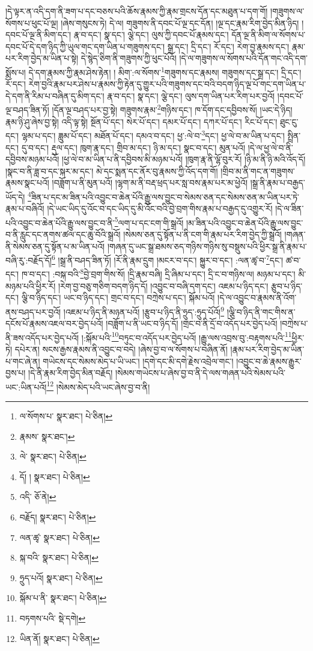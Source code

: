 །དེ་ལྟར་ན་འདི་དག་ནི་ཟག་པ་དང་བཅས་པའི་ཆོས་རྣམས་ཀྱི་རྣམ་གྲངས་དོན་དང་མཐུན་པ་དག་གོ། །གཟུགས་ལ་སོགས་པ་ཕུང་པོ་ལྔ། །ཞེས་གསུངས་ཏེ། དེ་ལ། གཟུགས་ནི་དབང་པོ་ལྔ་དང་དོན། །ལྔ་དང་རྣམ་རིག་བྱེད་མིན་ཉིད། །དབང་པོ་ལྔ་ནི་མིག་དང་། རྣ་བ་དང་། སྣ་དང་། ལྕེ་དང་། ལུས་ཀྱི་དབང་པོ་རྣམས་དང་། དོན་ལྔ་ནི་མིག་ལ་སོགས་པ་དབང་པོ་དེ་དག་ཉིད་ཀྱི་ཡུལ་གང་དག་ཡིན་པ་གཟུགས་དང་། སྒྲ་དང་། དྲི་དང་། རོ་དང་། རེག་བྱ་རྣམས་དང་། རྣམ་པར་རིག་བྱེད་མ་ཡིན་པ་སྟེ། དེ་སྙེད་ཅིག་ནི་གཟུགས་ཀྱི་ཕུང་པོའོ། །དེ་ལ་གཟུགས་ལ་སོགས་པའི་དོན་གང་འདི་དག་སྨོས་པ། དེ་དག་རྣམས་ཀྱི་རྣམ་ཤེས་རྟེན། །
མིག་:ལ་སོགས་\footnote{ལ་སོགས་པ་  སྣར་ཐང་།  པེ་ཅིན། }གཟུགས་དང་རྣམས། གཟུགས་དང་སྒྲ་དང་། དྲི་དང་། རོ་དང་། རེག་བྱའི་རྣམ་པར་ཤེས་པ་རྣམས་ཀྱི་རྟེན་དུ་གྱུར་པའི་གཟུགས་དང་བའི་བདག་ཉིད་ལྔ་པོ་གང་དག་ཡིན་པ་དེ་དག་ནི་རིམ་པ་བཞིན་དུ་མིག་དང་། རྣ་བ་དང་། སྣ་དང་། ལྕེ་དང་། ལུས་དག་ཡིན་པར་རིག་པར་བྱའོ། །དབང་པོ་ལྔ་བཤད་ཟིན་ཏོ། །དོན་ལྔ་བཤད་པར་བྱ་སྟེ། གཟུགས་རྣམ་\footnote{རྣམས་  སྣར་ཐང་། }གཉིས་དང་། ཁ་དོག་དང་དབྱིབས་སོ། །ཡང་དེ་ཉིད། རྣམ་ཉི་ཤུ་ཞེས་བྱ་སྟེ། འདི་ལྟ་སྟེ། སྔོན་པོ་དང་། སེར་པོ་དང་། དམར་པོ་དང་། དཀར་པོ་དང་། རིང་པོ་དང་། ཐུང་ངུ་དང་། ལྷམ་པ་དང་། ཟླུམ་པོ་དང་། མཐོན་པོ་དང་། དམའ་བ་དང་། ཕྱ་:ལེ་བ་\footnote{ལེ་  སྣར་ཐང་།  པེ་ཅིན། }དང་། ཕྱ་ལེ་བ་མ་ཡིན་པ་དང་། སྤྲིན་དང་། དུ་བ་དང་། རྡུལ་དང་། ཁུག་རྣ་དང་། གྲིབ་མ་དང་། ཉི་མ་དང་། སྣང་བ་དང་། མུན་པའོ། །དེ་ལ་ཕྱ་ལེ་བ་ནི་དབྱིབས་མཉམ་པའོ། །ཕྱ་ལེ་བ་མ་ཡིན་པ་ནི་དབྱིབས་མི་མཉམ་པའོ། །ཁུག་རྣ་ནི་ལྷོ་བུར་རོ། །ཉི་མ་ནི་ཉི་མའི་འོད་དོ། །སྣང་བ་ནི་ཟླ་བ་དང་སྐར་མ་དང་། མེ་དང་སྨན་དང་ནོར་བུ་རྣམས་ཀྱི་འོད་དག་གོ། །གྲིབ་མ་ནི་གང་ན་གཟུགས་རྣམས་སྣང་པའོ། །བཟློག་པ་ནི་མུན་པའོ། །ལྷག་མ་ནི་བརྡ་ཕྲད་པར་སླ་བས་རྣམ་པར་མ་ཕྱེའོ། །སྒྲ་ནི་རྣམ་པ་བརྒྱད་ཡོད་དེ། \footnote{དོ། །   སྣར་ཐང་།  པེ་ཅིན། }ཟིན་པ་དང་མ་ཟིན་པའི་འབྱུང་བ་ཆེན་པོའི་རྒྱུ་ལས་བྱུང་བ་སེམས་ཅན་དང་སེམས་ཅན་མ་ཡིན་པར་ཏེ་རྣམ་པ་བཞིའོ། །དེ་ཡང་ཡིད་དུ་འོང་བ་དང་ཡིད་དུ་མི་འོང་བའི་བྱེ་བྲག་གིས་རྣམ་པ་བརྒྱད་དུ་འགྱུར་རོ། །དེ་ལ་ཟིན་པའི་འབྱུང་བ་ཆེན་པོའི་རྒྱུ་ལས་བྱུང་བ་ནི་\footnote{འདི་  ཅོ་ནེ། }ལག་པ་དང་ངག་གི་སྒྲའོ། །མ་ཟིན་པའི་འབྱུང་བ་ཆེན་པོའི་རྒྱུ་ལས་བྱུང་བ་ནི་རླུང་དང་ནགས་ཚལ་དང་ཆུ་བོའི་སྒྲའོ། །སེམས་ཅན་དུ་སྟོན་པ་ནི་ངག་གི་རྣམ་པར་རིག་བྱེད་ཀྱི་སྒྲའོ། །གཞན་ནི་སེམས་ཅན་དུ་སྟོན་པ་མ་ཡིན་པའོ། །གཞན་དུ་ཡང་སྒྲ་ཐམས་ཅད་གཉིས་གཉིས་སུ་བསྡུས་པའི་ཕྱིར་སྒྲ་ནི་རྣམ་པ་བཞི་རུ་:བརྗོད་དོ།\footnote{བརྗོད།  སྣར་ཐང་།  པེ་ཅིན། } །སྒྲ་ནི་བཤད་ཟིན་ཏོ། །རོ་ནི་རྣམ་དྲུག །མངར་བ་དང་། སྐྱུར་བ་དང་། :ལན་ཚྭ་བ་\footnote{ལན་ཚྭ་  སྣར་ཐང་།  པེ་ཅིན། }དང་། ཚ་བ་དང་། ཁ་བ་དང་། :བསྐ་བའི་\footnote{སྐ་བའི་  སྣར་ཐང་།  པེ་ཅིན། }བྱེ་བྲག་གིས་སོ། །དྲི་རྣམ་བཞི། དྲི་ཞིམ་པ་དང་། དྲི་ང་བ་གཉིས་ལ། མཉམ་པ་དང་། མི་མཉམ་པའི་ཕྱིར་རོ། །རེག་བྱ་བཅུ་གཅིག་བདག་ཉིད་དོ། །འབྱུང་བ་བཞི་དག་དང་། འཇམ་པ་ཉིད་དང་། རྩུབ་པ་ཉིད་དང་། ལྕི་བ་ཉིད་དང་། ཡང་བ་ཉིད་དང་། གྲང་བ་དང་། བཀྲེས་པ་དང་། སྐོམ་པའོ། །དེ་ལ་འབྱུང་བ་རྣམས་ནི་འོག་ནས་བཤད་པར་བྱའོ། །འཇམ་པ་ཉིད་ནི་མཉན་པའོ། །རྩུབ་པ་ཉིད་ནི་ཧྲུད་:ཧྲུད་པོའོ།\footnote{ཧྲུད་པའོ།  སྣར་ཐང་།  པེ་ཅིན། } །ལྕི་བ་ཉིད་ནི་གང་གིས་ན་དངོས་པོ་རྣམས་འཇལ་བར་བྱེད་པའོ། །བཟློག་པ་ནི་ཡང་བ་ཉིད་དོ། །གྲང་བ་ནི་དྲོ་བ་འདོད་པར་བྱེད་པའོ། །བཀྲེས་པ་ནི་ཟས་འདོད་པར་བྱེད་པའོ། །:སྐོམ་པའི་\footnote{སྐོམ་པ་ནི་  སྣར་ཐང་།  པེ་ཅིན། }བཏུང་བ་འདོད་པར་བྱེད་པའོ། །རྒྱུ་ལས་འབྲས་བུ་:བརྟགས་པའི་\footnote{བཏགས་པའི་  སྡེ་དགེ། }ཕྱིར་ཏེ། དཔེར་ན། སངས་རྒྱས་རྣམས་ནི་འབྱུང་བ་བདེ། །ཞེས་བྱ་བ་ལ་སོགས་པ་བཞིན་ནོ། །རྣམ་པར་རིག་བྱེད་མ་ཡིན་པ་གང་ཞེ་ན། གཡེངས་དང་སེམས་མེད་པ་ཡི་ཡང་། །དགེ་དང་མི་དགེ་རྗེས་འབྲེལ་གང་། །འབྱུང་བ་ཆེ་རྣམས་རྒྱུར་བྱས་པ། །དེ་ནི་རྣམ་རིག་བྱེད་མིན་བརྗོད། །སེམས་གཡེངས་པ་ཞེས་བྱ་བ་ནི་དེ་ལས་གཞན་པའི་སེམས་པའི་ཡང་:ཡིན་པའོ།\footnote{ཡིན་ནོ།  སྣར་ཐང་།  པེ་ཅིན། } །སེམས་མེད་པའི་ཡང་ཞེས་བྱ་བ་ནི། 